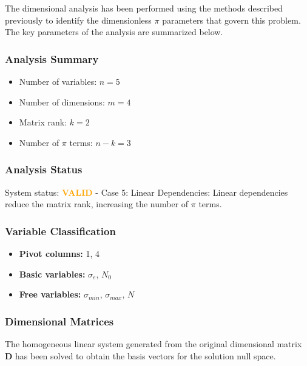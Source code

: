 The dimensional analysis has been performed using the methods described previously to identify the dimensionless $\pi$ parameters that govern this problem. The key parameters of the analysis are summarized below.

\subsubsection*{Analysis Summary}
\begin{itemize}
\item Number of variables: $n = 5$
\item Number of dimensions: $m = 4$
\item Matrix rank: $k = 2$
\item Number of $\pi$ terms: $n - k = 3$
\end{itemize}

\subsubsection*{Analysis Status}
System status: \textcolor{orange}{\textbf{VALID}} - Case 5: Linear Dependencies: Linear dependencies reduce the matrix rank, increasing the number of $\pi$ terms.

\subsubsection*{Variable Classification}
\begin{itemize}
\item \textbf{Pivot columns:} 1, 4
\item \textbf{Basic variables:} $\sigma_e$, $N_0$
\item \textbf{Free variables:} $\sigma_{min}$, $\sigma_{max}$, $N$
\end{itemize}

\subsubsection*{Dimensional Matrices}
The homogeneous linear system generated from the original dimensional matrix $\mathbf{D}$ has been solved to obtain the basis vectors for the solution null space.


